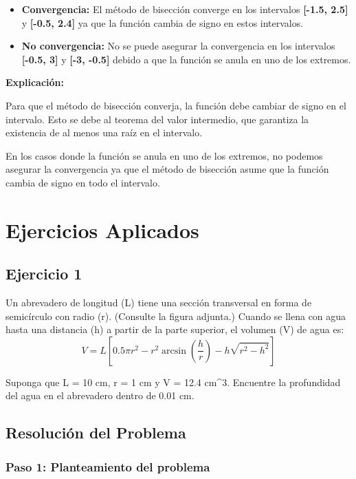 \documentclass[
  letterpaper,
  DIV=11,
  numbers=noendperiod]{scrartcl}
\providecommand{\tightlist}{%
  \setlength{\itemsep}{0pt}\setlength{\parskip}{0pt}}\usepackage{longtable,booktabs,array}
\begin{document}
\begin{itemize}
\tightlist
\item
  \textbf{Convergencia:} El método de bisección converge en los
  intervalos \textbf{{[}-1.5, 2.5{]}} y \textbf{{[}-0.5, 2.4{]}} ya que
  la función cambia de signo en estos intervalos.
\item
  \textbf{No convergencia:} No se puede asegurar la convergencia en los
  intervalos \textbf{{[}-0.5, 3{]}} y \textbf{{[}-3, -0.5{]}} debido a
  que la función se anula en uno de los extremos.
\end{itemize}

\textbf{Explicación:}

Para que el método de bisección converja, la función debe cambiar de
signo en el intervalo. Esto se debe al teorema del valor intermedio, que
garantiza la existencia de al menos una raíz en el intervalo.

En los casos donde la función se anula en uno de los extremos, no
podemos asegurar la convergencia ya que el método de bisección asume que
la función cambia de signo en todo el intervalo.

\section{Ejercicios Aplicados}\label{ejercicios-aplicados}

\subsection{Ejercicio 1}\label{ejercicio-1-1}

Un abrevadero de longitud (L) tiene una sección transversal en forma de
semicírculo con radio (r). (Consulte la figura adjunta.) Cuando se llena
con agua hasta una distancia (h) a partir de la parte superior, el
volumen (V) de agua es:\\
\[
V = L \left[ 0.5 \pi r^2 - r^2 \arcsin\left(\frac{h}{r}\right) - h \sqrt{r^2 - h^2} \right]
\]

Suponga que L = 10 cm, r = 1 cm y V = 12.4 cm\^{}3. Encuentre la
profundidad del agua en el abrevadero dentro de 0.01 cm.

\subsection{Resolución del Problema}\label{resoluciuxf3n-del-problema}

\subsubsection{Paso 1: Planteamiento del
problema}\label{paso-1-planteamiento-del-problema}
\end{document}
